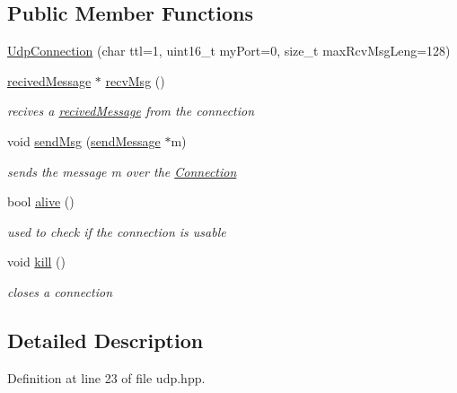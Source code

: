 \subsection*{Public Member Functions}
\begin{DoxyCompactItemize}
\item 
\hyperlink{classllu_1_1network_1_1_udp_connection_a715f5dabf94e43a9a54385a647cc587b}{Udp\+Connection} (char ttl=1, uint16\+\_\+t my\+Port=0, size\+\_\+t max\+Rcv\+Msg\+Leng=128)
\item 
\hyperlink{structllu_1_1network_1_1recived_message}{recived\+Message} $\ast$ \hyperlink{classllu_1_1network_1_1_udp_connection_abbd9d3906a283f5506a69a8922fa76c6}{recv\+Msg} ()
\begin{DoxyCompactList}\small\item\em recives a \hyperlink{structllu_1_1network_1_1recived_message}{recived\+Message} from the connection \end{DoxyCompactList}\item 
void \hyperlink{classllu_1_1network_1_1_udp_connection_a044432ee61191ecabd295fe4ea6cddf1}{send\+Msg} (\hyperlink{structllu_1_1network_1_1send_message}{send\+Message} $\ast$m)
\begin{DoxyCompactList}\small\item\em sends the message m over the \hyperlink{classllu_1_1network_1_1_connection}{Connection} \end{DoxyCompactList}\item 
bool \hyperlink{classllu_1_1network_1_1_udp_connection_add200cb20d4ece925b8752675d375828}{alive} ()
\begin{DoxyCompactList}\small\item\em used to check if the connection is usable \end{DoxyCompactList}\item 
void \hyperlink{classllu_1_1network_1_1_udp_connection_a97a62c2ab3975d9716f965aacc2f28fc}{kill} ()
\begin{DoxyCompactList}\small\item\em closes a connection \end{DoxyCompactList}\end{DoxyCompactItemize}


\subsection{Detailed Description}


Definition at line 23 of file udp.\+hpp.



